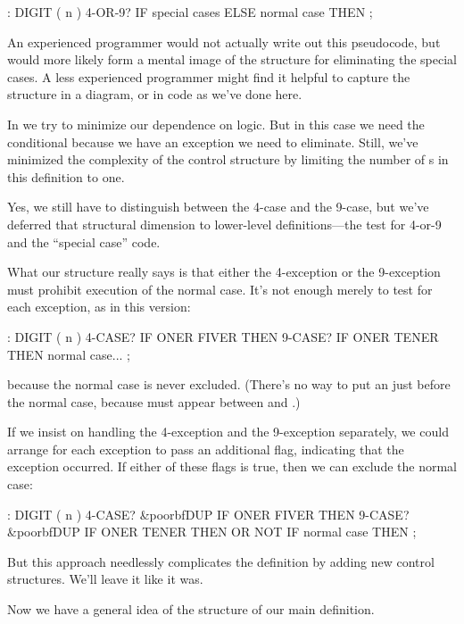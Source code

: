 \begin{Code}
: DIGIT  ( n )  4-OR-9? IF  special cases
   ELSE  normal case  THEN ;
\end{Code}
An experienced \Forth{} programmer would not actually write out this
pseudocode, but would more likely form a mental image of the structure
for eliminating the special cases. A less experienced programmer might
find it helpful to capture the structure in a diagram, or in code as we've
done here.

In \Forth{} we try to minimize our dependence on logic. But in this case
we need the conditional  because we have an exception we need
to eliminate. Still, we've minimized the complexity of the control
structure by limiting the number of s in this
definition to one.

Yes, we still have to distinguish between the 4-case and the 9-case,
but we've deferred that structural dimension to lower-level
definitions---the test for 4-or-9 and the ``special case'' code.

What our structure really says is that either the 4-exception or the
9-exception must prohibit execution of the normal case. It's not enough
merely to test for each exception, as in this version:

\begin{Code}
: DIGIT  ( n )  4-CASE? IF  ONER FIVER  THEN
                9-CASE? IF  ONER TENER  THEN
                normal case... ;
\end{Code}
because the normal case is never excluded. (There's no way to put an
 just before the normal case, because  must
appear between  and .)

If we insist on handling the 4-exception and the 9-exception separately,
we could arrange for each exception to pass an additional flag, indicating
that the exception occurred. If either of these flags is true, then we can
exclude the normal case:

\begin{Code}[commandchars=\&\{\}]
: DIGIT  ( n )  4-CASE? &poorbf{DUP} IF  ONER FIVER  THEN
                9-CASE? &poorbf{DUP} IF  ONER TENER  THEN
                OR  NOT IF normal case THEN ;
\end{Code}
But this approach needlessly complicates the definition by adding new
control structures. We'll leave it like it was.

Now we have a general idea of the structure of our main definition.

